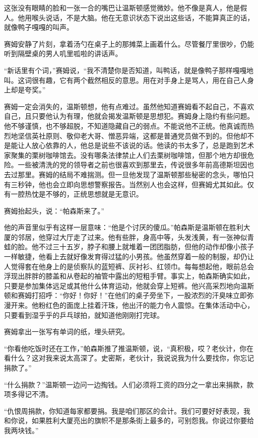 这张没有眼睛的脸和一张一合的嘴巴让温斯顿感觉微妙。他不像是真人，他是假人。他用喉头说话，不是大脑。他在无意识状态下说出这些话，不能算真正的话，就像鸭子嘎嘎的叫声。

赛姆安静了片刻，拿着汤勺在桌子上的那摊菜上画着什么。尽管餐厅里很吵，仍能听到隔壁桌的男人叽里呱啦的讲话声。

``新话里有个词，''赛姆说，``我不清楚你是否知道，叫鸭话，就是像鸭子那样嘎嘎地叫。这词很有趣，它有两个截然相反的意思。用在对手身上是骂人，用在自己人身上却是夸奖。''

赛姆一定会消失的，温斯顿想，他有点难过。虽然他知道赛姆看不起自己，不喜欢自己，且只要他认为有理，他就会揭发温斯顿是思想犯。赛姆身上隐约有些问题。他不够谨慎，也不够超脱，不知道隐藏自己的弱点。不能说他不正统。他真诚而热烈地坚信英社原则、敬仰老大哥、憎恶异端，这都是普通党员做不到的。但他却不是能让人放心依靠的人，他总是说些不该说的话。他读的书太多了，总是跑到艺术家聚集的栗树咖啡馆去。没有哪条法律禁止人们去栗树咖啡馆，但那个地方却很危险。一些被清洗的党的领导者之前也很喜欢到那里去，传说很多年前高德斯坦因也去过那里。赛姆的结局不难揣测。但一旦他发现了温斯顿那些秘密的念头，哪怕只有三秒钟，他也会立即向思想警察报告。当然别人也会这样，但赛姆尤其如此。仅有一腔热忱是不够的，正统思想就是无意识。

赛姆抬起头，说：``帕森斯来了。''

他的声音里似乎有这样一层意味：``他是个讨厌的傻瓜。''帕森斯是温斯顿在胜利大厦的邻居，他穿过大厅走了过来。他有些胖，身高中等，头发浅黄，有一张神似青蛙的脸。他不过三十五岁，脖子和腰上就堆着一团团脂肪，但他的动作却像小孩子一样敏捷，他看上去就好像发育得过猛的小男孩。他虽然穿着一般的制服，却仍让人觉得套在他身上的是侦察队的蓝短裤、灰衬衫、红领巾。每每想起他，眼前总会浮现出胖胖的膝盖和从卷起的袖管中露出的短粗手臂。事实上，帕森斯确实如此，只要是参加集体远足或其他什么体育运动，他就会穿上短裤。他兴高采烈地向温斯顿和赛姆打招呼：``你好！你好！''在他们的桌子旁坐下，一股浓烈的汗臭味立即弥漫开来。他粉红色的面庞上挂着汗珠，他出汗的能力令人震惊。在集体活动中心，只要看到湿乎乎的乒乓球拍，就知道他刚刚打完球。

赛姆拿出一张写有单词的纸，埋头研究。

``你看他吃饭时还在工作，''帕森斯推了推温斯顿，说，``真积极，哎？老伙计，你在看什么？这对我来说太高深了。史密斯，老伙计，我说说我为什么要找你，你忘记捐款了。''

``什么捐款？''温斯顿一边问一边掏钱。人们必须将工资的四分之一拿出来捐款，款项多得记不清。

``仇恨周捐款，你知道每家都要捐。我是咱们那区的会计。我们可要好好表现，我和你说，如果胜利大厦亮出的旗帜不是那条街上最多的，可别怨我。你说过你要给我两块钱。''

